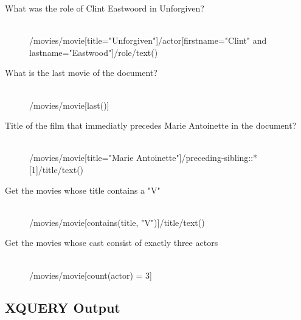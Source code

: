 \documentclass[xPath&xQuery.tex]{subfiles}
\begin{document}
\begin{description}
  \item[What was the role of Clint Eastwoord in Unforgiven?] \hfill \\
  /movies/movie[title="Unforgiven"]/actor[firstname="Clint" and lastname="Eastwood"]/role/text()
  
  \item[What is the last movie of the document?] \hfill \\
  /movies/movie[last()]
  
  \item[Title of the film that immediatly precedes Marie Antoinette in the document?] \hfill \\ 
  /movies/movie[title="Marie Antoinette"]/preceding-sibling::*[1]/title/text()
  
  \item[Get the movies whose title contains a "V"] \hfill \\
  /movies/movie[contains(title, "V")]/title/text()
  
  \item[Get the movies whose cast consist of exactly three actors] \hfill \\
    /movies/movie[count(actor) = 3]
\end{description} 

\subsection{XQUERY Output}
\end{document}
